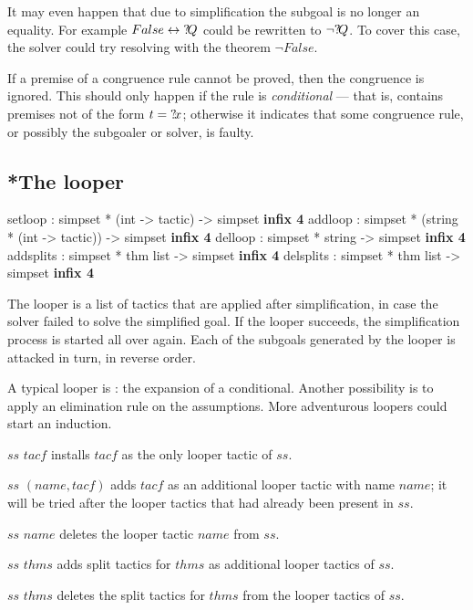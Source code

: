 It may even happen that due to simplification the subgoal is no longer
an equality.  For example $False \leftrightarrow {?\!Q}$ could be rewritten to
$\neg{?\!Q}$.  To cover this case, the solver could try resolving
with the theorem $\neg False$.

\medskip

\begin{warn}
  If a premise of a congruence rule cannot be proved, then the
  congruence is ignored.  This should only happen if the rule is
  \emph{conditional} --- that is, contains premises not of the form $t
  = {?\!x}$; otherwise it indicates that some congruence rule, or
  possibly the subgoaler or solver, is faulty.
\end{warn}


\subsection{*The looper}\label{sec:simp-looper}
\begin{ttbox}
setloop   : simpset *           (int -> tactic)  -> simpset \hfill{\bf infix 4}
addloop   : simpset * (string * (int -> tactic)) -> simpset \hfill{\bf infix 4}
delloop   : simpset *  string                    -> simpset \hfill{\bf infix 4}
addsplits : simpset * thm list -> simpset \hfill{\bf infix 4}
delsplits : simpset * thm list -> simpset \hfill{\bf infix 4}
\end{ttbox}

The looper is a list of tactics that are applied after simplification, in case
the solver failed to solve the simplified goal.  If the looper
succeeds, the simplification process is started all over again.  Each
of the subgoals generated by the looper is attacked in turn, in
reverse order.

A typical looper is : the expansion of a conditional.
Another possibility is to apply an elimination rule on the
assumptions.  More adventurous loopers could start an induction.

\begin{ttdescription}
  
\item[$ss$ \ttindexbold{setloop} $tacf$] installs $tacf$ as the only looper
  tactic of $ss$.
  
\item[$ss$ \ttindexbold{addloop} $(name,tacf)$] adds $tacf$ as an additional
  looper tactic with name $name$; it will be tried after the looper tactics
  that had already been present in $ss$.
  
\item[$ss$ \ttindexbold{delloop} $name$] deletes the looper tactic $name$
  from $ss$.
  
\item[$ss$ \ttindexbold{addsplits} $thms$] adds
  split tactics for $thms$ as additional looper tactics of $ss$.

\item[$ss$ \ttindexbold{addsplits} $thms$] deletes the
  split tactics for $thms$ from the looper tactics of $ss$.

\end{ttdescription}

